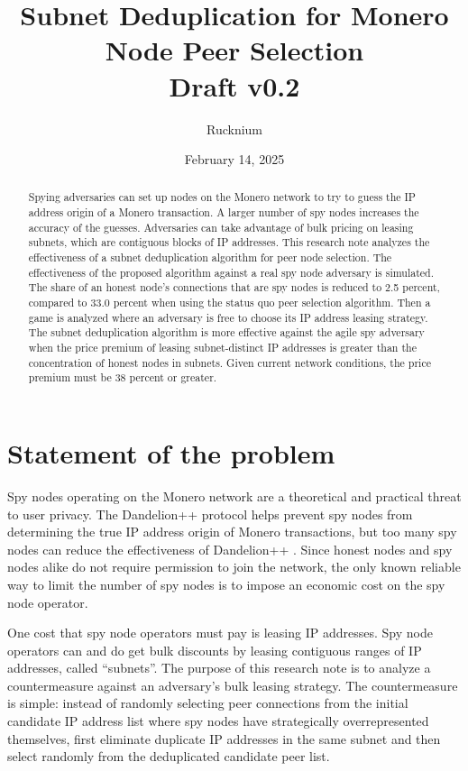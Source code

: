 \documentclass[usletter,11pt,english,openany]{article}
\begin{document}
\title{Subnet Deduplication for Monero Node Peer Selection\\\vspace{.3cm}
\large Draft v0.2\vspace{-.715cm}}
\author{Rucknium }
\date{February 14, 2025}
\maketitle
\begin{abstract}
Spying adversaries can set up nodes on the Monero network to try to
guess the IP address origin of a Monero transaction. A larger number
of spy nodes increases the accuracy of the guesses. Adversaries can
take advantage of bulk pricing on leasing subnets, which are contiguous
blocks of IP addresses. This research note analyzes the effectiveness
of a subnet deduplication algorithm for peer node selection. The effectiveness
of the proposed algorithm against a real spy node adversary is simulated.
The share of an honest node's connections that are spy nodes is reduced
to 2.5 percent, compared to 33.0 percent when using the status quo
peer selection algorithm. Then a game is analyzed where an adversary
is free to choose its IP address leasing strategy. The subnet deduplication
algorithm is more effective against the agile spy adversary when the
price premium of leasing subnet-distinct IP addresses is greater than
the concentration of honest nodes in subnets. Given current network
conditions, the price premium must be 38 percent or greater.
\end{abstract}

\section{Statement of the problem}

Spy nodes operating on the Monero network are a theoretical and practical
threat to user privacy. The Dandelion++ protocol helps prevent spy
nodes from determining the true IP address origin of Monero transactions,
but too many spy nodes can reduce the effectiveness of Dandelion++
\cite{Fanti2018a}. Since honest nodes and spy nodes alike do not
require permission to join the network, the only known reliable way
to limit the number of spy nodes is to impose an economic cost on
the spy node operator.

One cost that spy node operators must pay is leasing IP addresses.
Spy node operators can and do get bulk discounts by leasing contiguous
ranges of IP addresses, called ``subnets''. The purpose of this
research note is to analyze a countermeasure against an adversary's
bulk leasing strategy. The countermeasure is simple: instead of randomly
selecting peer connections from the initial candidate IP address list
where spy nodes have strategically overrepresented themselves, first
eliminate duplicate IP addresses in the same subnet and then select
randomly from the deduplicated candidate peer list.
\end{document}
